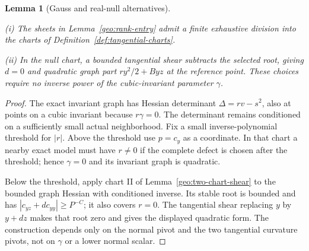 \documentclass[11pt]{amsart}
\newtheorem{lemma}[theorem]{Lemma}
\theoremstyle{definition}
\theoremstyle{remark}
\numberwithin{equation}{section}
\begin{document}
\begin{lemma}[Gauss and real-null alternatives]\label{geo:chart-split}

\leavevmode\noindent\textup{(i)} The sheets in Lemma~\ref{geo:rank-entry} admit a finite exhaustive division into the charts of Definition~\ref{def:tangential-charts}.

\noindent\textup{(ii)} In the null chart, a bounded tangential shear subtracts the selected root, giving $d=0$ and quadratic graph part $ry^2/2+Byz$ at the reference point. These choices require no inverse power of the cubic-invariant parameter $\gamma$.
\end{lemma}
\begin{proof}
The exact invariant graph has Hessian determinant $\Delta=rv-s^2$, also at points on a cubic invariant because $r\gamma=0$. The determinant remains conditioned on a sufficiently small actual neighborhood. Fix a small inverse-polynomial threshold for $|r|$. Above the threshold use $p=c_y$ as a coordinate. In that chart a nearby exact model must have $r\ne0$ if the complete defect is chosen after the threshold; hence $\gamma=0$ and its invariant graph is quadratic.

Below the threshold, apply chart II of Lemma~\ref{geo:two-chart-shear} to the bounded graph Hessian with conditioned inverse. Its stable root is bounded and has $|c_{yz}+dc_{yy}|\ge P^{-C}$; it also covers $r=0$. The tangential shear replacing $y$ by $y+dz$ makes that root zero and gives the displayed quadratic form. The construction depends only on the normal pivot and the two tangential curvature pivots, not on $\gamma$ or a lower normal scalar.
\end{proof}
\end{document}
